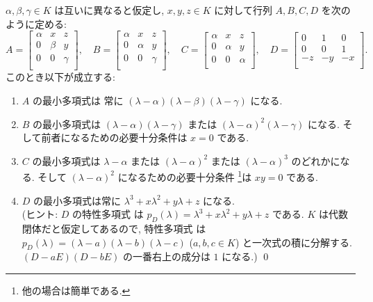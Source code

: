 \documentclass[12pt,twoside]{jarticle}
\begin{document}
\begin{question}
\label{q:minimal-polyn-9}
  $\alpha,\beta,\gamma\in K$ は互いに異なると仮定し,
  $x,y,z\in K$ に対して行列 $A,B,C,D$ を次のように定める:
  \begin{equation*}
    A = 
    \begin{bmatrix}
      \alpha & x     & z \\
      0      & \beta & y \\
      0      & 0     & \gamma \\
    \end{bmatrix},
    \quad
    B = 
    \begin{bmatrix}
      \alpha & x      & z \\
      0      & \alpha & y \\
      0      & 0      & \gamma \\
    \end{bmatrix},
    \quad
    C = 
    \begin{bmatrix}
      \alpha & x      & z \\
      0      & \alpha & y \\
      0      & 0      & \alpha \\
    \end{bmatrix},
    \quad
    D =
    \begin{bmatrix}
      0  & 1  & 0 \\
      0  & 0  & 1 \\
      -z & -y & -x \\
    \end{bmatrix}.
  \end{equation*}
  このとき以下が成立する:
  \begin{enumerate}
  \item $A$ の最小多項式は  
    常に $(\lambda-\alpha)(\lambda-\beta)(\lambda-\gamma)$ になる.
  \item $B$ の最小多項式は $(\lambda-\alpha)(\lambda-\gamma)$ 
    または $(\lambda-\alpha)^2(\lambda-\gamma)$ になる.
    そして前者になるための必要十分条件は $x=0$ である.
  \item $C$ の最小多項式は $\lambda-\alpha$ または $(\lambda-\alpha)^2$
    または $(\lambda-\alpha)^3$ のどれかになる.
    そして $(\lambda-\alpha)^2$ になるための必要十分条件%
    \footnote{他の場合は簡単である.}は $xy=0$ である.
  \item $D$ の最小多項式は常に $\lambda^3+x\lambda^2+y\lambda+z$ になる. 
    \\(ヒント: $D$ の特性多項式
    は $p_D(\lambda)=\lambda^3+x\lambda^2+y\lambda+z$ である.
    $K$ は代数閉体だと仮定してあるので, 特性多項式
    は $p_D(\lambda)=(\lambda-a)(\lambda-b)(\lambda-c)$ ($a,b,c\in K$) 
    と一次式の積に分解する.  $(D-aE)(D-bE)$ の一番右上の成分は $1$ になる.)
    \qed
  \end{enumerate}
\end{question}
\end{document}
